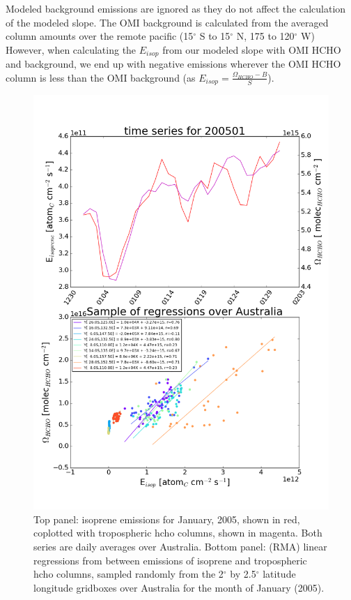 \documentclass[acp, manuscript]{copernicus} %
\begin{document}
    Modeled background emissions are ignored as they do not affect the calculation of the modeled slope.
    The OMI background is calculated from the averaged column amounts over the remote pacific (15$^{\circ}$ S to 15$^{\circ}$ N, 175 to 120$^{\circ}$ W)
    However, when calculating the $E_{isop}$ from our modeled slope with OMI HCHO and background, we end up with negative emissions wherever the OMI HCHO column is less than the OMI background (as $E_{isop} = \frac{\Omega_{HCHO} - B}{S}$).
    \begin{figure}[!htbp]
      \includegraphics[width=\textwidth]{figures/E_isop_vs_hcho_series_200501.png}
      \caption{%
	Top panel: isoprene emissions for January, 2005, shown in red, coplotted with tropospheric hcho columns, shown in magenta.
	Both series are daily averages over Australia.
	Bottom panel: (RMA) linear regressions from between emissions of isoprene and tropospheric hcho columns, sampled randomly from the 2$^{\circ}$ by 2.5$^{\circ}$ latitude longitude gridboxes over Australia for the month of January (2005).
      }
      \label{fig:E_isop_vs_hcho_model_sample}
    \end{figure}
    
\end{document}
